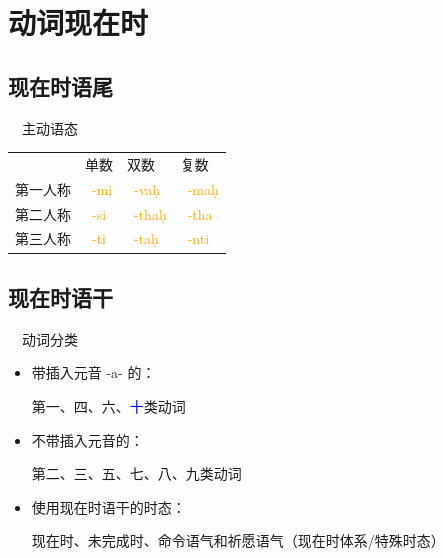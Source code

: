 \documentclass[17pt]{beamer}
\newcommand{\skt}[1]{{\sanskritfont{#1}}} %
\newcommand{\wordending}[1]{\textcolor{Orange}{\nobreakdash-#1}}
\newcommand{\sktending}[1]{{\textcolor{Orange}{\skt{-#1}}}}
\newcommand{\skttransending}[1]{{\sktending{#1}~\wordending{#1}}}
\begin{document}
\section[动词 \\ ~~现在时]{动词现在时}
\begin{frame}{\insertsection }
    \tableofcontents[currentsection]
\end{frame}

\subsection{现在时语尾}
\begin{frame}{\insertsubsection ~~主动语态}
  \small
  \centering
  \begin{tabular}{@{}llll@{}} %
    & 单数  & 双数  & 复数 \\
    第一人称 & \skttransending{mi} & \skttransending{vaḥ}  & \skttransending{maḥ}  \\
    第二人称 & \skttransending{si} & \skttransending{thaḥ} & \skttransending{tha}   \\
    第三人称 & \skttransending{ti} & \skttransending{taḥ} & \skttransending{nti}  \\
  \end{tabular}   
\end{frame}

\subsection{现在时语干}
\begin{frame}{\insertsubsection ~~动词分类}
  \begin{itemize}
    \item
      带插入元音 \nobreakdash-a\nobreakdash- 的：
      
      第一、四、六、\textcolor{blue}{十}类动词
    \item
      不带插入元音的：
      
      第二、三、五、七、八、九类动词
    \item
      使用现在时语干的时态：
      
      现在时、未完成时、命令语气和祈愿语气（现在时体系/特殊时态）
  \end{itemize}  
\end{frame}
\end{document}
